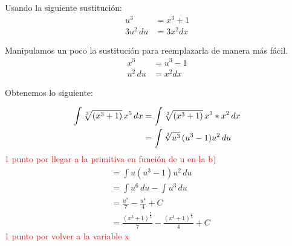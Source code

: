 \documentclass[a4paper,10pt]{article}
\newcommand{\dis}{\displaystyle}
\begin{document}
\begin{enumerate}[label=\emph{\alph*)}]
Usando la siguiente sustitución:
\begin{align*}
u^3 &= x^3+1 \\
3u^2 \, du &= 3x^2 dx
\end{align*}

Manipulamos un poco la sustitución para reemplazarla de manera más fácil.
\begin{align*}
x^3 &= u^3-1 \\
u^2 \, du &= x^2 dx
\end{align*}

Obtenemos lo siguiente:

\begin{align*}
 \dis \dis \int \sqrt[3]{(x^3+1)}\, x^5\, dx &= \dis \int \sqrt[3]{(x^3+1)}\, x^3* x^2\, dx \\
      &=  \dis \int \sqrt[3]{u^3}\, (u^3-1) u^2 \, du
       \end{align*}
 \textcolor{red}{1 punto por llegar a la primitiva en función de u en la b)}
 \begin{align*}
       &=  \int u(u^3-1) u^2 \, du \\
       &=  \int u^6\, du - \int u^3 \, du\\
       &=  \frac{u^7}{7} - \frac{u^4}{4} + C\\
        &=  \frac{(x^3+1)^{\frac{7}{3}}}{7} - \frac{(x^3+1)^{\frac{4}{3}}}{4} + C
\end{align*}
\textcolor{red}{1 punto por volver a la variable x}

\end{enumerate}
\end{document}
